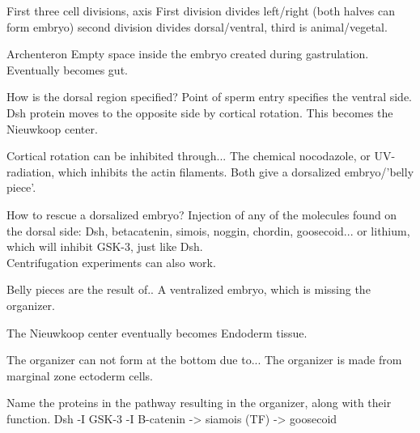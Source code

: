 \begin{flashcard}{First three cell divisions, axis}
    First division divides left/right (both halves can form embryo) second division divides dorsal/ventral, third is animal/vegetal.
\end{flashcard}

\begin{flashcard}[Gastrulation]{Archenteron}
    Empty space inside the embryo created during gastrulation. Eventually becomes gut. 
\end{flashcard}

\begin{flashcard}{How is the dorsal region specified?}
Point of sperm entry specifies the ventral side. Dsh protein moves to the opposite side by cortical rotation. This becomes the Nieuwkoop center.
\end{flashcard}

\begin{flashcard}{Cortical rotation can be inhibited through...}
The chemical nocodazole, or UV-radiation, which inhibits the actin filaments. Both give a dorsalized embryo/'belly piece'.
\end{flashcard}

\begin{flashcard}{How to rescue a dorsalized embryo?}
Injection of any of the molecules found on the dorsal side: Dsh, betacatenin, simois, noggin, chordin, goosecoid... or lithium, which will inhibit GSK-3, just like Dsh.\\ Centrifugation experiments can also work.
\end{flashcard}

\begin{flashcard}{Belly pieces are the result of..}
    A ventralized embryo, which is missing the organizer.
\end{flashcard}

\begin{flashcard}{The Nieuwkoop center eventually becomes}
    Endoderm tissue. 
\end{flashcard}


\begin{flashcard}{The organizer can not form at the bottom due to...}
    The organizer is made from marginal zone ectoderm cells. 
\end{flashcard}

\begin{flashcard}{Name the proteins in the pathway resulting in the organizer, along with their function.}
    Dsh -I GSK-3 -I B-catenin -> siamois (TF) -> goosecoid 
\end{flashcard}

